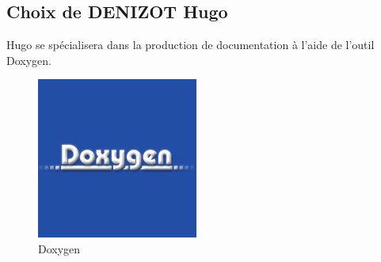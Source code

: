 \documentclass[12pt,french]{article} %
\begin{document}
\subsection{Choix de DENIZOT Hugo}

Hugo se spécialisera dans la production de documentation à l'aide de l'outil Doxygen.

\begin{figure}[H]
	\centering
	\includegraphics[scale=0.35]{chugo.png}
	\caption{Doxygen}    
\end{figure}


\newpage


\listoffigures
\end{document}
